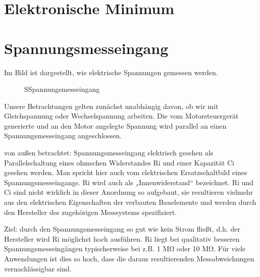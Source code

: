 \documentclass[letterpaper,10pt,english]{jupyterBook}
\let\sphinxpxdimen\pdfpxdimen\else\newdimen\sphinxpxdimen
\begin{document}
\sphinxstepscope


\section{Elektronische Minimum}
\label{\detokenize{content/4_Grundlagen_Elektronik:elektronische-minimum}}\label{\detokenize{content/4_Grundlagen_Elektronik::doc}}
\sphinxstepscope


\section{Spannungsmesseingang}
\label{\detokenize{content/4_U-Messeingang:spannungsmesseingang}}\label{\detokenize{content/4_U-Messeingang::doc}}
\sphinxAtStartPar
Im Bild ist dargestellt, wie elektrische Spannungen gemessen werden.

\begin{figure}[htbp]
\centering
\capstart

\noindent\sphinxincludegraphics[width=400\sphinxpxdimen]{{spannungsmesseingang_last}.jpg}
\caption{SSpannungsmesseingang}\label{\detokenize{content/4_U-Messeingang:markdown-fig}}\end{figure}

\sphinxAtStartPar
Unsere Betrachtungen gelten zunächst unabhängig davon, ob wir mit Gleichspannung oder Wechselspannung arbeiten.
Die vom Motorsteuergerät generierte und an den Motor angelegte Spannung wird parallel an einen Spannungsmesseingang angeschlossen.

\sphinxAtStartPar
von außen betrachtet: Spannungsmesseingang elektrisch gesehen als Parallelschaltung eines ohmschen Widerstandes Ri und einer Kapazität Ci gesehen werden. Man spricht hier auch vom elektrischen Ersatzschaltbild eines Spannungsmesseingangs.
Ri wird auch als „Innenwiderstand“ bezeichnet. Ri und Ci sind nicht wirklich in dieser Anordnung so aufgebaut, sie resultieren vielmehr aus den elektrischen Eigenschaften der verbauten Bauelemente und werden durch den Hersteller des zugehörigen Messsystems spezifiziert.

\sphinxAtStartPar
Ziel: durch den Spannungsmesseingang so gut wie kein Strom fließt, d.h. der Hersteller wird Ri möglichst hoch ausführen.
Ri liegt bei qualitativ besseren Spannungsmesseingängen typischerweise bei z.B. 1 MΩ oder 10 MΩ.
Für viele Anwendungen ist dies so hoch, dass die daraus resultierenden Messabweichungen vernachlässigbar sind.
\end{document}

